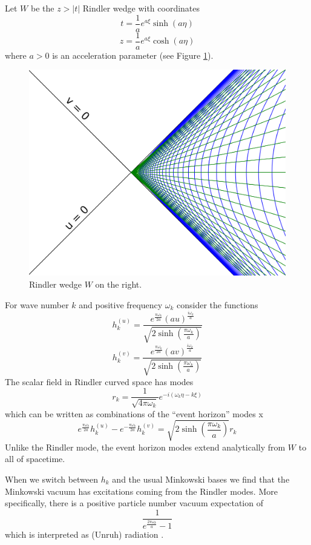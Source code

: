 \documentclass[12pt,a4paper]{article}
\begin{document}
Let $W$ be the $z>|t|$ Rindler wedge with coordinates
\[
t = \frac{1}{a}e^{a\xi}\sinh{(a\eta)}
\]
\[
z = \frac{1}{a}e^{a\xi}\cosh{(a\eta)}
\]
where $a>0$ is an acceleration parameter (see Figure \ref{rindlerw}).

\begin{figure}[h]
\centering
\includegraphics[scale=0.4]{rindler_w.png}
\caption{Rindler wedge $W$ on the right.}
\label{rindlerw}
\end{figure}


For wave number $k$ and positive frequency $\omega_k$ consider the functions
\[
h^{(u)}_k = \frac{e^{\frac{\pi \omega_k}{2a}} {(au)}^{\frac{i\omega_k}{a}}}{ \sqrt{2\sinh\left(\frac{\pi\omega_k}{a}\right)} }
\]
\[
h^{(v)}_k = \frac{e^{\frac{\pi \omega_k}{2a}} {(av)}^{\frac{i\omega_k}{a}}}{ \sqrt{2\sinh\left(\frac{\pi\omega_k}{a}\right)} }
\]
The scalar field in Rindler curved space has modes
\[
 r_k = \frac{1}{\sqrt{4 \pi \omega_k}} e^{-i(\omega_k \eta -k \xi)}
\]
which can be written as combinations of the ``event horizon'' modes
x\[
e^\frac{\pi\omega_k}{2a} h^{(u)}_k - e^{-\frac{\pi\omega_k}{2a}} h^{(v)}_k  = \sqrt{2 \sinh \left({\frac{\pi\omega_k}{a}}\right)} r_k
\]
Unlike the Rindler mode, the event horizon modes extend analytically from $W$ to all of spacetime.


When we switch between $h_k$ and the usual Minkowski bases we find that the Minkowski vacuum has excitations coming from the Rindler modes.  More specifically, there is a positive particle number vacuum expectation of
\begin{equation}
\label{radeq}
\frac{1}{e^{\frac{2 \pi \omega_k}{a}}-1}
\end{equation}
which is interpreted as (Unruh) radiation \cite{unruh}.
\end{document}
